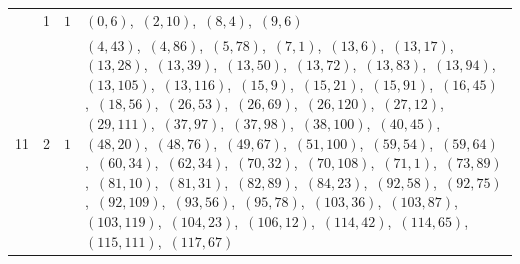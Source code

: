 \documentclass[11pt]{article}
\begin{document}
\begin{longtable}{@{}rrl>{\raggedright\arraybackslash}p{}@{}}
\addlinespace[3pt]
11 & 1 & $1$ & $(0,6)$,\allowbreak\ $(2,10)$,\allowbreak\ $(8,4)$,\allowbreak\ $(9,6)$\\
11 & 2 & $1$ & $(4,43)$,\allowbreak\ $(4,86)$,\allowbreak\ $(5,78)$,\allowbreak\ $(7,1)$,\allowbreak\ $(13,6)$,\allowbreak\ $(13,17)$,\allowbreak\ $(13,28)$,\allowbreak\ $(13,39)$,\allowbreak\ $(13,50)$,\allowbreak\ $(13,72)$,\allowbreak\ $(13,83)$,\allowbreak\ $(13,94)$,\allowbreak\ $(13,105)$,\allowbreak\ $(13,116)$,\allowbreak\ $(15,9)$,\allowbreak\ $(15,21)$,\allowbreak\ $(15,91)$,\allowbreak\ $(16,45)$,\allowbreak\ $(18,56)$,\allowbreak\ $(26,53)$,\allowbreak\ $(26,69)$,\allowbreak\ $(26,120)$,\allowbreak\ $(27,12)$,\allowbreak\ $(29,111)$,\allowbreak\ $(37,97)$,\allowbreak\ $(37,98)$,\allowbreak\ $(38,100)$,\allowbreak\ $(40,45)$,\allowbreak\ $(48,20)$,\allowbreak\ $(48,76)$,\allowbreak\ $(49,67)$,\allowbreak\ $(51,100)$,\allowbreak\ $(59,54)$,\allowbreak\ $(59,64)$,\allowbreak\ $(60,34)$,\allowbreak\ $(62,34)$,\allowbreak\ $(70,32)$,\allowbreak\ $(70,108)$,\allowbreak\ $(71,1)$,\allowbreak\ $(73,89)$,\allowbreak\ $(81,10)$,\allowbreak\ $(81,31)$,\allowbreak\ $(82,89)$,\allowbreak\ $(84,23)$,\allowbreak\ $(92,58)$,\allowbreak\ $(92,75)$,\allowbreak\ $(92,109)$,\allowbreak\ $(93,56)$,\allowbreak\ $(95,78)$,\allowbreak\ $(103,36)$,\allowbreak\ $(103,87)$,\allowbreak\ $(103,119)$,\allowbreak\ $(104,23)$,\allowbreak\ $(106,12)$,\allowbreak\ $(114,42)$,\allowbreak\ $(114,65)$,\allowbreak\ $(115,111)$,\allowbreak\ $(117,67)$\\

\end{longtable}
\end{document}

